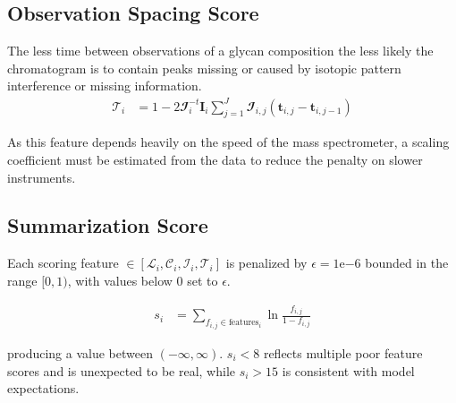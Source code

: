     \subsection{Observation Spacing Score}
        The less time between observations of a glycan composition the less likely the chromatogram
        is to contain peaks missing or caused by isotopic pattern interference or missing information.
        \begin{align}
            \mathscr{T}_i &= 1 - 2\mathbfcal{I}_i^{-t}\mathbf{I}_i\sum_{j=1}^J\mathbfcal{I}_{i, j}(
                \mathbf{t}_{i, j} - \mathbf{t}_{i, j - 1})
        \end{align}

        As this feature depends heavily on the speed of the mass spectrometer, a scaling coefficient
        must be estimated from the data to reduce the penalty on slower instruments.

    \subsection{Summarization Score}
        Each scoring feature $\in \left[\mathscr{L}_i, \mathscr{C}_i, \mathscr{I}_i,
        \mathscr{T}_i\right]$ is penalized by $\epsilon = 1\mathrm{e}{-6}$ bounded in
        the range $[0, 1)$, with values below 0 set to $\epsilon$.

        \begin{align}
            s_i &= \sum_{f_{i,j} \in \text{features}_i}{\ln{
                \frac{f_{i, j}}{1 - f_{i, j}}
                }
            }
        \end{align}

        \noindent producing a value between $(-\infty, \infty)$. $s_i < 8$ reflects multiple
        poor feature scores and is unexpected to be real, while $s_i > 15$ is
        consistent with model expectations.
